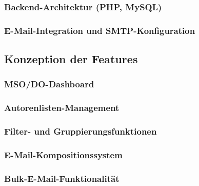 \documentclass[11pt,a4paper]{article}
\begin{document}
\subsubsection{Backend-Architektur (PHP, MySQL)}

\subsubsection{E-Mail-Integration und SMTP-Konfiguration}

\subsection{Konzeption der Features}

\subsubsection{MSO/DO-Dashboard}

\subsubsection{Autorenlisten-Management}

\subsubsection{Filter- und Gruppierungsfunktionen}

\subsubsection{E-Mail-Kompositionssystem}

\subsubsection{Bulk-E-Mail-Funktionalität}
\end{document}
